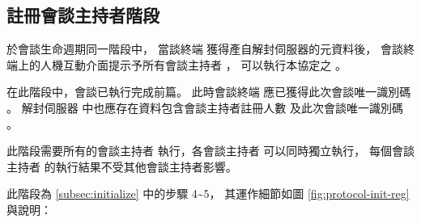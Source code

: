 \subsection{註冊會談主持者階段}\label{subsec:protocol-init-reg}

    於會談生命週期同一階段中，
當談終端 \DEFmeetingbox 獲得產自解封伺服器的元資料後，
會談終端上的人機互動介面提示予所有會談主持者 \DEFownerAll，
可以執行本協定之 。

    在此階段中，會談已執行完成前篇。
此時會談終端 \DEFmeetingbox 應已獲得此次會談唯一識別碼 \DEFsessionID。
解封伺服器 \DEFserver 中也應存在資料包含會談主持者註冊人數 \DEFowreg 及此次會談唯一識別碼 \DEFsessionID。

    此階段需要所有的會談主持者 \DEFownerAll 執行，各會談主持者 \DEFowner 可以同時獨立執行，
每個會談主持者 \DEFowner 的執行結果不受其他會談主持者影響。

    此階段為 \ref{subsec:initialize} 中的步驟 4\textasciitilde5，
其運作細節如圖 \ref{fig:protocol-init-reg}與說明：

